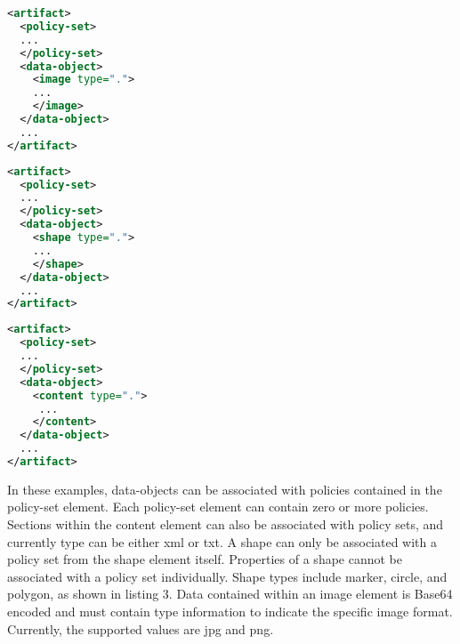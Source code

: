 \par\noindent
\begin{minipage}[t]{.30\textwidth}
\begin{lstlisting}[language=xml, label=lst:image-data, caption=Image]
<artifact>
  <policy-set>
  ...
  </policy-set>
  <data-object>
    <image type=".">
    ...
    </image>
  </data-object>
  ...
</artifact>
\end{lstlisting}
\end{minipage}
\hfill
\begin{minipage}[t]{.30\textwidth}
\begin{lstlisting}[language=xml, label=lst:shape-data, caption=Shape]
<artifact>
  <policy-set>
  ...
  </policy-set>
  <data-object>
    <shape type=".">
    ...
    </shape>
  </data-object>
  ...
</artifact>
\end{lstlisting}
\end{minipage}
\hfill
\begin{minipage}[t]{.30\textwidth}
\begin{lstlisting}[language=xml, label=lst:content-data, caption=Content]
<artifact>
  <policy-set>
  ...
  </policy-set>
  <data-object>
    <content type=".">
     ...
    </content>
  </data-object>
  ...
</artifact>
\end{lstlisting}
\end{minipage}

In these examples, data-objects can be associated with policies contained in the policy-set element.  Each policy-set element can contain zero or more policies.  Sections within the content element can also be associated with policy sets, and currently type can be either xml or txt.  A shape can only be associated with a policy set from the shape element itself.  Properties of a shape cannot be associated with a policy set individually.  Shape types include marker, circle, and polygon, as shown in listing 3. Data contained within an image element is Base64 encoded and must contain type information to indicate the specific image format.  Currently, the supported values are jpg and png.

